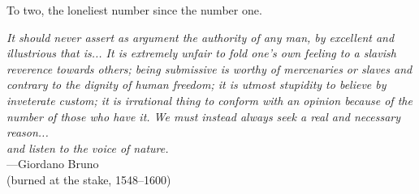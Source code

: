 %
\begin{frontmatter}

%
%
\makefrontmatter 

%
%   
%
%
%
\begin{dedication} 
  To two, the loneliest number since the number one.
\end{dedication}


%   
% 



%
%
\begin{epigraph} %
\emph{
It should never assert as argument the authority of any man, by excellent and illustrious that is... It is extremely unfair to fold one's own feeling to a slavish reverence towards others; being submissive is worthy of mercenaries or slaves and contrary to the dignity of human freedom; it is utmost stupidity to believe by inveterate custom; it is irrational thing to conform with an opinion because of the number of those who have it. We must instead always seek a real and necessary reason... \\
and listen to the voice of nature.
} \\
---Giordano Bruno \\
(burned at the stake, 1548--1600)
\end{epigraph}


\end{frontmatter}
